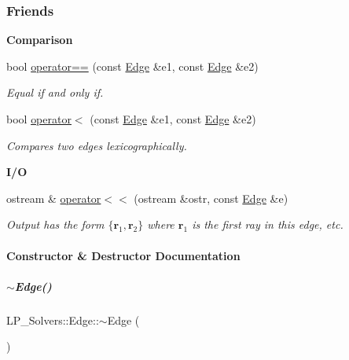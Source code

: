 \subsubsection*{Friends}
\begin{Indent}\textbf{ Comparison}\par
\begin{DoxyCompactItemize}
\item 
bool \hyperlink{group___c_l_s_solvers_a02f62dc93f3810dedf600e1890d0a01a}{operator==} (const \hyperlink{group___c_l_s_solvers_class_l_p___solvers_1_1_edge}{Edge} \&e1, const \hyperlink{group___c_l_s_solvers_class_l_p___solvers_1_1_edge}{Edge} \&e2)
\begin{DoxyCompactList}\small\item\em Equal if and only if. \end{DoxyCompactList}\item 
bool \hyperlink{group___c_l_s_solvers_aab1d947f208d0ba281c45ec9717522d6}{operator$<$} (const \hyperlink{group___c_l_s_solvers_class_l_p___solvers_1_1_edge}{Edge} \&e1, const \hyperlink{group___c_l_s_solvers_class_l_p___solvers_1_1_edge}{Edge} \&e2)
\begin{DoxyCompactList}\small\item\em Compares two edges lexicographically. \end{DoxyCompactList}\end{DoxyCompactItemize}
\end{Indent}
\begin{Indent}\textbf{ I/O}\par
\begin{DoxyCompactItemize}
\item 
ostream \& \hyperlink{group___c_l_s_solvers_a21cc787db181be486f871e88cfc2ef54}{operator$<$$<$} (ostream \&ostr, const \hyperlink{group___c_l_s_solvers_class_l_p___solvers_1_1_edge}{Edge} \&e)
\begin{DoxyCompactList}\small\item\em Output has the form $ \{ \mathbf{r}_1, \mathbf{r}_2 \} $ where $ \mathbf{r}_1 $ is the first ray in this edge, etc. \end{DoxyCompactList}\end{DoxyCompactItemize}
\end{Indent}


\paragraph{Constructor \& Destructor Documentation}
\mbox{\label{group___c_l_s_solvers_a752de1869e522b7b7a1eb9ef67664c9f}} 
\subparagraph{\texorpdfstring{$\sim$\+Edge()}{~Edge()}}
{\footnotesize\ttfamily L\+P\+\_\+\+Solvers\+::\+Edge\+::$\sim$\+Edge (\begin{DoxyParamCaption}{ }\end{DoxyParamCaption})\hspace{0.3cm}{\ttfamily [inline]}}

